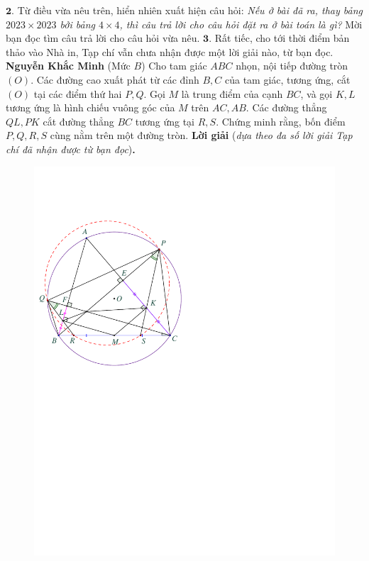 \begin{multicols}{2}
	\vskip 0.05cm
	$\pmb{2.}$ Từ điều vừa nêu trên, hiển nhiên xuất hiện câu hỏi: \textit{Nếu ở bài đã ra, thay bảng \linebreak$2023 \times 2023$ bởi bảng $4 \times 4$, thì câu trả lời cho câu hỏi đặt ra ở bài toán là gì?} Mời bạn đọc tìm câu trả lời cho câu hỏi vừa nêu.
	\vskip 0.05cm
	$\pmb{3.}$ Rất tiếc, cho tới thời điểm bản thảo vào Nhà in, Tạp chí vẫn chưa nhận được một lời giải nào, từ bạn đọc.
	\vskip 0.05cm
	\hfill\textbf{\color{thachthuctoanhoc}Nguyễn Khắc Minh}
	\vskip 0.05cm
	{}
	(Mức $B$) Cho tam giác $ABC$ nhọn, nội tiếp đường tròn $(O)$. Các đường cao xuất phát từ các đỉnh $B,C$ của tam giác, tương ứng, cắt $(O)$ tại các điểm thứ hai $P,Q$. Gọi $M$ là trung điểm của cạnh $BC$, và gọi $K, L$ tương ứng là hình chiếu vuông góc của $M$ trên $AC, A B$. Các đường thẳng $Q L, P K$ cắt đường thẳng $B C$ tương ứng tại $R, S$. Chứng minh rằng, bốn điểm $P, Q, R, S$ cùng nằm trên một đường tròn.
	\vskip 0.05cm
	\textbf{\color{thachthuctoanhoc}Lời giải} (\textit{dựa theo đa số lời giải Tạp chí đã nhận được từ bạn đọc})\textbf{\color{thachthuctoanhoc}.}
	\begin{figure}[H]
		\centering
		\vspace*{-5pt}
		\captionsetup{labelformat= empty, justification=centering}
		\includegraphics[width=0.82\linewidth]{P624}

\end{figure}
\end{multicols}
